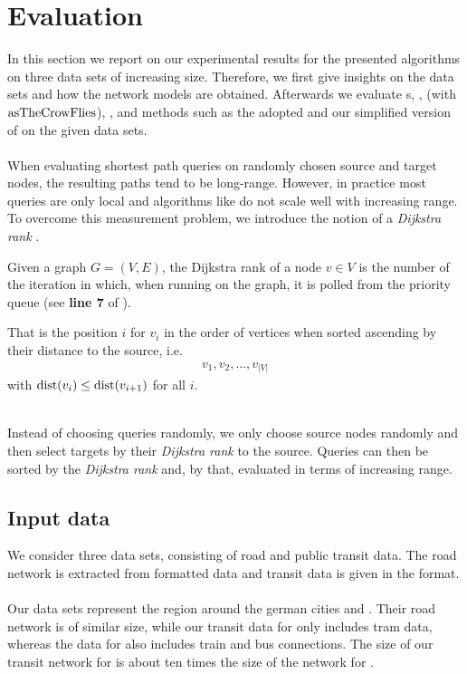 \section{Evaluation}\label{evaluation}
	In this section we report on our experimental results for the presented algorithms on three data sets of increasing size.
	Therefore, we first give insights on the data sets and how the network models are obtained. Afterwards we evaluate
	{\coverTree}s, \dijkstra, \astar (with $\operatorname{asTheCrowFlies}$), \alt, \csa and \multiModal methods such as the adopted \dijkstra
	and our simplified version of \anr on the given data sets.\\\\
	When evaluating shortest path queries on randomly chosen source and target nodes, the resulting paths tend to be long-range.
	However, in practice most queries are only local and algorithms like \dijkstra do not scale well with increasing range.
	To overcome this measurement problem, we introduce the notion of a \textit{Dijkstra rank} .
	\begin{mydef}\label{dijkstraRank}
		Given a graph $G = (V, E)$, the \textnormal{Dijkstra rank} of a node $v \in V$ is the number of the iteration in which,
		when running \dijkstra on the graph, it is polled from the priority queue (see \textbf{line 7} of ).
		
		That is the position $i$ for $v_i$ in the order of vertices when sorted ascending by their distance to the source, i.e.
		\begin{align*}
			v_1, v_2, \ldots, v_{|V|}
		\end{align*}
		with $\operatorname{dist}(v_i) \le \operatorname{dist}(v_{i + 1})$ for all $i$.
	\end{mydef}\quad\\
	Instead of choosing queries randomly, we only choose source nodes randomly and then select targets by their
	\textit{Dijkstra rank} to the source. Queries can then be sorted by the \textit{Dijkstra rank} and, by that,
	evaluated in terms of increasing range.

\subsection{Input data}
	We consider three data sets, consisting of road and public transit data. The road network is extracted from \osm {}
	formatted data and transit data is given in the \gtfs {} format.\\\\
	Our data sets represent the region around the german cities \freiburgR and \stuttgartR. Their road network is
	of similar size, while our transit data for \freiburgR only includes tram data, whereas the data for \stuttgartR
	also includes train and bus connections. The size of our transit network for \stuttgartR is about ten times the size of
	the network for \freiburgR.
	
